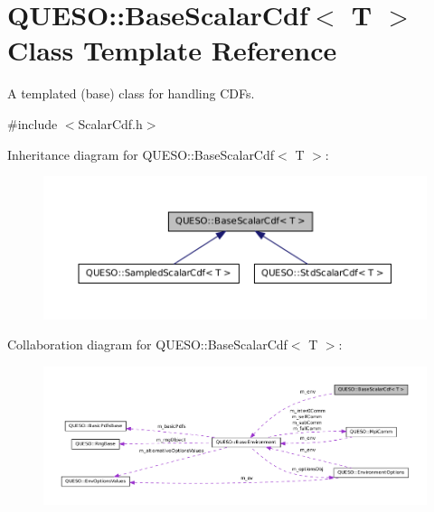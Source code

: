 \hypertarget{class_q_u_e_s_o_1_1_base_scalar_cdf}{\section{Q\-U\-E\-S\-O\-:\-:Base\-Scalar\-Cdf$<$ T $>$ Class Template Reference}
\label{class_q_u_e_s_o_1_1_base_scalar_cdf}
}


A templated (base) class for handling C\-D\-Fs.  




{\ttfamily \#include $<$Scalar\-Cdf.\-h$>$}



Inheritance diagram for Q\-U\-E\-S\-O\-:\-:Base\-Scalar\-Cdf$<$ T $>$\-:
\nopagebreak
\begin{figure}[H]
\begin{center}
\leavevmode
\includegraphics[width=350pt]{class_q_u_e_s_o_1_1_base_scalar_cdf__inherit__graph}
\end{center}
\end{figure}


Collaboration diagram for Q\-U\-E\-S\-O\-:\-:Base\-Scalar\-Cdf$<$ T $>$\-:
\nopagebreak
\begin{figure}[H]
\begin{center}
\leavevmode
\includegraphics[width=350pt]{class_q_u_e_s_o_1_1_base_scalar_cdf__coll__graph}
\end{center}
\end{figure}
